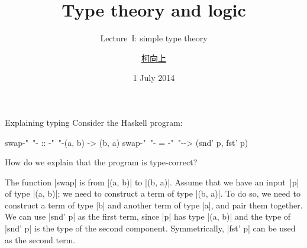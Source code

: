 \documentclass[t,compress,hyperref={hidelinks}]{beamer}
\newcommand{\lectureno}{I}
\begin{document}

\title{Type theory and logic}
\subtitle{Lecture~\lectureno: simple type theory}
\date{1 July 2014}
\author{{\href{http://www.cs.ox.ac.uk/people/hsiang-shang.ko/}{柯向上}}}

{
\begin{frame}
\titlepage
\end{frame}}

\begin{frame}[fragile]{Explaining typing}
Consider the Haskell program:
\begin{code}
swap{-"~"-}  ::  {-"~"-}(a, b) -> (b, a)
swap{-"~"-}  =   {-"~"-}\p -> (snd' p, fst' p)
\end{code}
How do we explain that the program is type-correct?

\small
The function |swap| is from |(a, b)| to |(b, a)|.
Assume that we have an input~|p| of type |(a, b)|; we need to construct a term of type |(b, a)|.
To do so, we need to construct a term of type |b| and another term of type |a|, and pair them together.
We can use |snd' p| as the first term, since |p| has type |(a, b)| and the type of |snd' p| is the type of the second component.
Symmetrically, |fst' p| can be used as the second term.
\end{frame}
\end{document}
